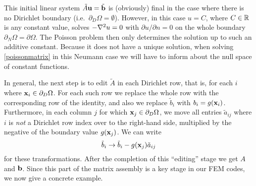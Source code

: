 This initial linear system $\tilde A\mathbf{u}=\tilde {\mathbf{b}}$ is (obviously) final in the case where there is no Dirichlet boundary (i.e.~$\partial_D \Omega=\emptyset$).  However, in this case $u=C$, where $C\in\mathbb{R}$ is any constant value, solves $-\nabla^2 u=0$ with $\partial u/\partial n = 0$ on the whole boundary $\partial_N \Omega = \partial \Omega$.  The Poisson problem then only determines the solution up to such an additive constant.  Because it does not have a unique solution, when solving \eqref{poissonmatrix} in this Neumann case we will have to inform \PETSc about the null space of constant functions.

In general, the next step is to edit $\tilde A$ in each Dirichlet row, that is, for each $i$ where $\mathbf{x}_i \in \partial_D \Omega$.  For each such row we replace the whole row with the corresponding row of the identity, and also we replace $\tilde b_i$ with $b_i = g(\mathbf{x}_i)$.  Furthermore, in each column $j$ for which $\mathbf{x}_j \in \partial_D \Omega$, we move all entries $\tilde a_{ij}$ where $i$ is \emph{not} a Dirichlet row index over to the right-hand side, multiplied by the negative of the boundary value $g(\mathbf{x}_{j})$.  We can write
\begin{equation}
    \tilde b_i \to \tilde b_i - g(\mathbf{x}_{j}) \tilde a_{ij} \label{btransform}
\end{equation}
for these transformations.  After the completion of this ``editing'' stage we get $A$ and $\mathbf{b}$.  Since this part of the matrix assembly is a key stage in our FEM codes, we now give a concrete example.

